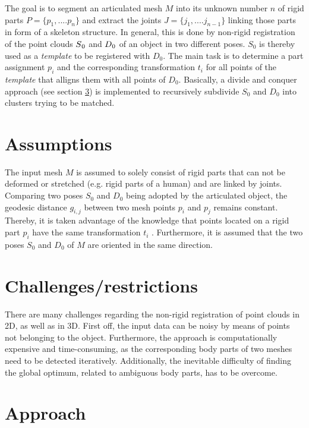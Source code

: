 \documentclass[a4paper,english,11pt]{report}
\begin{document}
The goal is to segment an articulated mesh $M$ into its unknown number $n$ of rigid parts $ P =  \{ {p_1,....p_n}\}$ and extract the joints $ J =  \{ {j_1,....j_{n-1}}\}$ linking those parts in form of a skeleton structure. In general, this is done by non-rigid registration of the point clouds $S\textsubscript{0}$ and $D\textsubscript{0}$ of an object in two different poses. $S_0$ is thereby used as a \textit{template} to be registered with $D_0$. The main task is to determine a part assignment $p_i$ and the corresponding transformation $t_i$ for all points of the \textit{template} that alligns them with all points of $D_0$. Basically, a divide and conquer approach (see section \ref{divideAndConquer}) is implemented to recursively subdivide $S_0$ and $D_0$ into clusters trying to be matched.

\section{Assumptions}

The input mesh $M$ is assumed to solely consist of rigid parts that can not be deformed or stretched (e.g. rigid parts of a human) and are linked by joints. Comparing two poses $S_0$ and $D_0$ being adopted by the articulated object, the geodesic distance $g_{i,j}$ between two mesh points $p_i$ and $p_j$ remains constant. Thereby, it is taken advantage of the knowledge that points located on a rigid part $p_i$ have the same transformation $t_i$ . Furthermore, it is assumed that the two poses $S_0$ and $D_0$ of $M$ are oriented in the same direction.

\section{Challenges/restrictions}

There are many challenges regarding the non-rigid registration of point clouds in 2D, as well as in 3D. First off, the input data can be noisy by means of points not belonging to the object. Furthermore, the approach is computationally expensive and time-consuming, as the corresponding body parts of two meshes need to be detected iteratively. Additionally, the inevitable difficulty of finding the global optimum, related to ambiguous body parts, has to be overcome.

\section{Approach}
\label{divideAndConquer}
\end{document}
